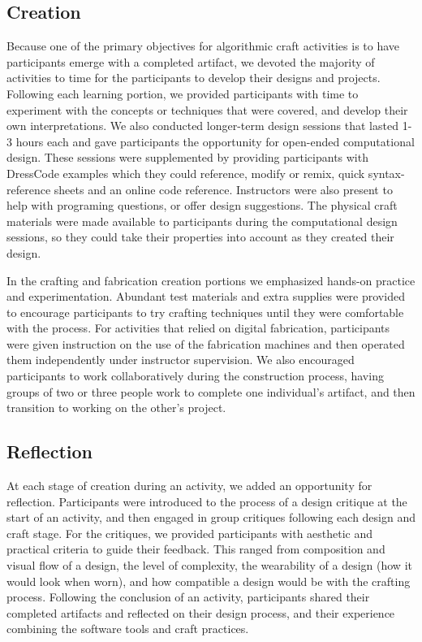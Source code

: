 \documentclass{sigchi}
\begin{document}
\subsection{Creation}
Because one of the primary objectives for algorithmic craft activities is to have participants emerge with a completed artifact, we devoted the majority of activities to time for the participants to develop their designs and projects. Following each learning portion, we provided participants with time to experiment with the concepts or techniques that were covered, and develop their own interpretations. We also conducted longer-term design sessions that lasted 1-3 hours each and gave participants the opportunity for open-ended computational design. These sessions were supplemented by providing participants with DressCode examples which they could reference, modify or remix, quick syntax-reference sheets and an online code reference. Instructors were also present to help with programing questions, or offer design suggestions. The physical craft materials were made available to participants during the computational design sessions, so they could take their properties into account as they created their design. 

In the crafting and fabrication creation portions we emphasized hands-on practice and experimentation. Abundant test materials and extra supplies were provided to encourage participants to try crafting techniques until they were comfortable with the process. For activities that relied on digital fabrication, participants were given instruction on the use of the fabrication machines and then operated them independently under instructor supervision. We also encouraged participants to work collaboratively during the construction process, having groups of two or three people work to complete one individual's artifact, and then transition to working on the other's project. 

\subsection{Reflection}
At each stage of creation during an activity, we added an opportunity for reflection. Participants were introduced to the process of a design critique at the start of an activity, and then engaged in group critiques following each design and craft stage. For the critiques, we provided participants with  aesthetic and practical criteria to  guide their feedback. This ranged from composition and visual flow of a design, the level of complexity, the wearability of a design (how it would look when worn), and how compatible a design would be with the crafting process. Following the conclusion of an activity, participants shared their completed artifacts and reflected on their design process, and their experience combining the software tools and craft practices. 
\end{document}
